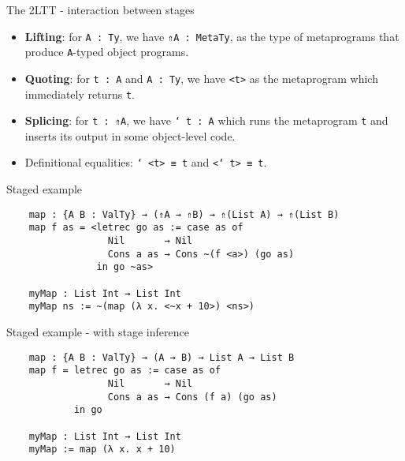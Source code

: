 \documentclass[dvipsnames,aspectratio=169]{beamer}
\newcommand{\ttt}[1]{{\texttt{#1}}}
\theoremstyle{remark}
\begin{document}
\begin{frame}[fragile]{The 2LTT - interaction between stages}

\begin{itemize}
\item \textbf{Lifting}: for \ttt{A : Ty}, we have \ttt{⇑A : MetaTy}, as the type of
      metaprograms that produce \ttt{A}-typed object programs.
\item \textbf{Quoting}: for \ttt{t : A} and \ttt{A : Ty}, we have \ttt{<t>} as the metaprogram
      which immediately returns \ttt{t}.
\item \textbf{Splicing}: for \ttt{t : ⇑A}, we have \ttt{\char`~t : A} which runs the
       metaprogram \ttt{t} and inserts its output in some object-level code.
\item Definitional equalities: \ttt{\char`~<t> ≡ t} and \ttt{<\char`~t> ≡ t}.
\end{itemize}

\end{frame}

\begin{frame}[fragile]{Staged example}

\begin{verbatim}
    map : {A B : ValTy} → (⇑A → ⇑B) → ⇑(List A) → ⇑(List B)
    map f as = <letrec go as := case as of
                  Nil       → Nil
                  Cons a as → Cons ~(f <a>) (go as)
                in go ~as>

    myMap : List Int → List Int
    myMap ns := ~(map (λ x. <~x + 10>) <ns>)
\end{verbatim}

\end{frame}

\begin{frame}[fragile]{Staged example - with stage inference}

\begin{verbatim}
    map : {A B : ValTy} → (A → B) → List A → List B
    map f = letrec go as := case as of
                  Nil       → Nil
                  Cons a as → Cons (f a) (go as)
            in go

    myMap : List Int → List Int
    myMap := map (λ x. x + 10)
\end{verbatim}
\end{frame}
\end{document}
